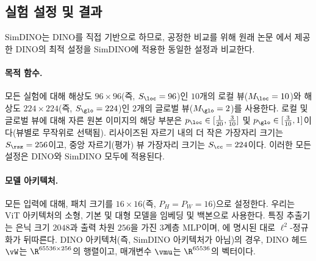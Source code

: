 \documentclass[../../book-main_ko.tex]{subfiles}
\begin{document}
\subsection{실험 설정 및 결과} \label{sub:contrastive_learning_experiment_results}

SimDINO는 DINO를 직접 기반으로 하므로, 공정한 비교를 위해 원래 논문 \citep{caron2021emerging}에서 제공한 DINO의 최적 설정을 SimDINO에 적용한 동일한 설정과 비교한다.

\paragraph{목적 함수.} 모든 실험에 대해 해상도 \(96 \times 96\)(즉, \(S_{\loc} = 96\))인 \(10\)개의 로컬 뷰(\(M_{\loc} = 10\))와 해상도 \(224 \times 224\)(즉, \(S_{\glo} = 224\))인 \(2\)개의 글로벌 뷰(\(M_{\glo} = 2\))를 사용한다. 로컬 및 글로벌 뷰에 대해 자른 원본 이미지의 해당 부분은 \(p_{\loc} \in [\frac{1}{20}, \frac{3}{10}]\) 및 \(p_{\glo} \in [\frac{3}{10}, 1]\)이다(뷰별로 무작위로 선택됨). 리사이즈된 자르기 내의 더 작은 가장자리 크기는 \(S_{\rsz} = 256\)이고, 중앙 자르기(평가) 뷰 가장자리 크기는 \(S_{\cc} = 224\)이다. 이러한 모든 설정은 DINO와 SimDINO 모두에 적용된다.

\paragraph{모델 아키텍처.} 모든 입력에 대해, 패치 크기를 \(16 \times 16\)(즉, \(P_{H} = P_{W} = 16\))으로 설정한다. 우리는 ViT \citep{dosovitskiy2020image} 아키텍처의 소형, 기본 및 대형 모델을 임베딩 및 백본으로 사용한다. 특징 추출기는 은닉 크기 \(2048\)과 출력 차원 \(256\)을 가진 3계층 MLP이며, 에 명시된 대로 \(\ell^{2}\)-정규화가 뒤따른다. DINO 아키텍처(즉, SimDINO 아키텍처가 아님)의 경우, DINO 헤드 \(\vW\)는 \(\R^{65536 \times 256}\)의 행렬이고, 매개변수 \(\vmu\)는 \(\R^{65536}\)의 벡터이다.
\end{document}

